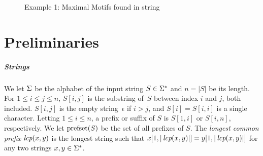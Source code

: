 \begin{figure}[t]
        \centering
        \quad
        \caption{Example 1: Maximal Motifs found in string\label{ex:one}}
\end{figure}


\section{Preliminaries}
\label{sec:preliminaries}

\subparagraph{Strings}
%
We let $\Sigma$ be the alphabet of the input string $S \in \Sigma^*$ and $n = |S|$ be its length.
For $1 \leq i \leq j \leq n$, $S[i, j]$ is the substring of~$S$ between index $i$ and $j$, both included. $S[i, j]$ is the empty string~$\epsilon$ if $i > j$, and $S[i] = S[i, i]$ is a single character. Letting $1 \leq i \leq n$, a prefix or suffix of $S$ is $S[1, i]$ or $S[i, n]$, respectively. We let $\operatorname{prefset}(S)$ be the set of all prefixes of $S$. The \emph{longest common prefix} $\operatorname{\textit{lcp}}(x, y)$ is the longest string such that $x[1, |\operatorname{\textit{lcp}}(x, y)|] = y[1, |\operatorname{\textit{lcp}}(x, y)|]$ for any two strings $x, y \in \Sigma^*$.  

